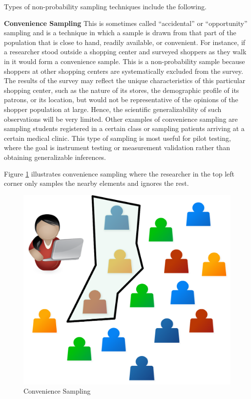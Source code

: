 Types of non-probability sampling techniques include the following.

\textbf{Convenience Sampling} This is sometimes called ``accidental'' or ``opportunity'' sampling and is a technique in which a sample is drawn from that part of the population that is close to hand, readily available, or convenient. For instance, if a researcher stood outside a shopping center and surveyed shoppers as they walk in it would form a convenience sample. This is a non-probability sample because shoppers at other shopping centers are systematically excluded from the survey. The results of the survey may reflect the unique characteristics of this particular shopping center, such as the nature of its stores, the demographic profile of its patrons, or its location, but would not be representative of the opinions of the shopper population at large. Hence, the scientific generalizability of such observations will be very limited. Other examples of convenience sampling are sampling students registered in a certain class or sampling patients arriving at a certain medical clinic. This type of sampling is most useful for pilot testing, where the goal is instrument testing or measurement validation rather than obtaining generalizable inferences.

Figure \ref{07:fig07} illustrates convenience sampling where the researcher in the top left corner only samples the nearby elements and ignores the rest.

\begin{figure}[H]
	\centering
	\includegraphics[width=\maxwidth{.35\linewidth}]{gfx/07-07}
	\caption{Convenience Sampling}
	\label{07:fig07}
\end{figure}

